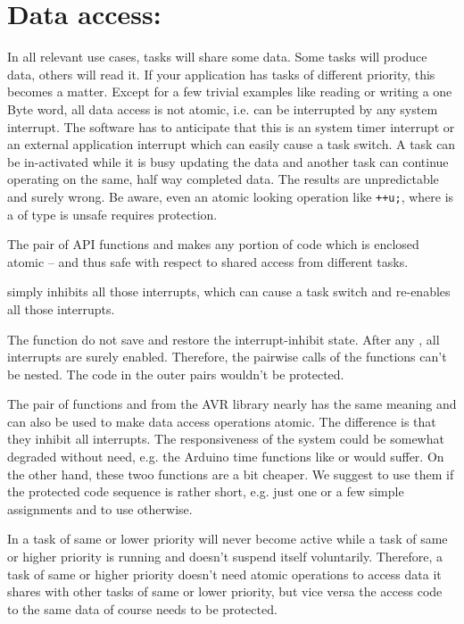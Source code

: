\section{Data access: }

In all relevant use cases, tasks will share some data. Some tasks will
produce data, others will read it. If your application has tasks of
different priority, this becomes a matter. Except for a few trivial
examples like reading or writing a one Byte word, all data access is not
atomic, i.e. can be interrupted by any system interrupt. The software has
to anticipate that this is an \rtos{} system timer interrupt or an \rtos{}
external application interrupt which can easily cause a task switch. A
task can be in-activated while it is busy updating the data and another
task can continue operating on the same, half way completed data. The
results are unpredictable and surely wrong. Be aware, even an atomic
looking operation like \verb$++u;$, where  is a of type
 is unsafe requires protection.

The pair of API functions  and
 makes any portion of code which is
enclosed atomic -- and thus safe with respect to shared access from
different tasks.

 simply inhibits all those interrupts,
which can cause a task switch and 
re-enables all those interrupts.

The function do not save and restore the interrupt-inhibit state. After
any , all interrupts are surely enabled.
Therefore, the pairwise calls of the functions can't be nested. The code
in the outer pairs wouldn't be protected.

The pair of functions  and  from the AVR library
nearly has the same meaning and can also be used to make data access
operations atomic. The difference is that they inhibit all interrupts. The
responsiveness of the system could be somewhat degraded without need, e.g.
the Arduino time functions like  or  would
suffer. On the other hand, these twoo functions are a bit cheaper. We
suggest to use them if the protected code sequence is rather short, e.g.
just one or a few simple assignments and to use
 otherwise.

In \rtos{} a task of same or lower priority will never become active while
a task of same or higher priority is running and doesn't suspend itself
voluntarily. Therefore, a task of same or higher priority doesn't need
atomic operations to access data it shares with other tasks of same or lower
priority, but vice versa the access code to the same data of course needs
to be protected.

